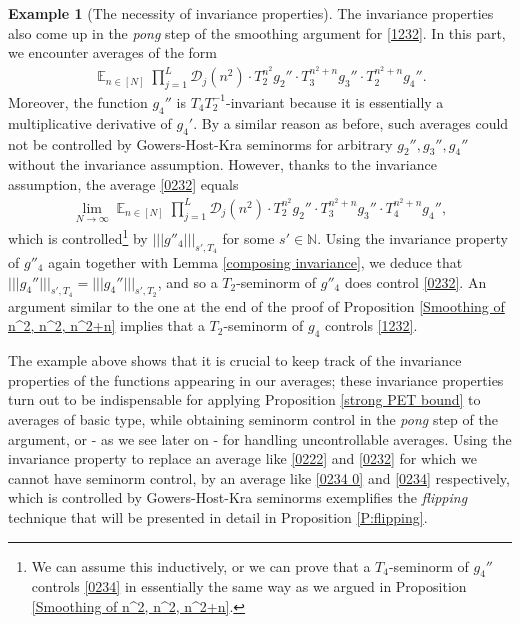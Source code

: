 \documentclass[11pt]{amsart}
\theoremstyle{definition}
\newtheorem{example}{Example}
\newcommand{\N}{{\mathbb N}}
\newcommand{\CD}{{\mathcal D}}
\newcommand{\nnorm}[1]{\lvert\!|\!| #1|\!|\!\rvert}
\newcommand{\inv}{^{-1}}
\DeclareMathOperator*{\E}{\mathbb{E}}
\begin{document}
\begin{example}[The necessity of invariance properties]
The invariance properties also come up in the \textit{pong} step of the smoothing argument for \eqref{1232}. In this part, we encounter averages of the form
\begin{align}\label{0232}
    \E_{n\in[N]}\prod_{j=1}^L \CD_{j}(n^2)\cdot T_2^{n^2} g_2''\cdot T_3^{n^2+n}g_3''\cdot T_2^{n^2+n}g_4''.
\end{align}
Moreover, the function $g_4''$ is $T_4 T_2\inv$-invariant because it is essentially a multiplicative derivative of $g_4'$. By a similar reason as before, such averages could not be controlled by Gowers-Host-Kra seminorms for arbitrary $g_2'', g_3'', g_4''$ without the invariance assumption. However, thanks to the invariance assumption, the average \eqref{0232} equals
\begin{align}\label{0234}
        \lim_{N\to\infty} \E_{n\in[N]}\prod_{j=1}^L \CD_{j}(n^2)\cdot T_2^{n^2} g_2''\cdot T_3^{n^2+n}g_3''\cdot T_4^{n^2+n}g_4'',
\end{align}
which is controlled\footnote{We can assume this inductively, or we can prove that a $T_4$-seminorm of $g_4''$ controls \eqref{0234} in essentially the same way as we argued in Proposition \ref{Smoothing of n^2, n^2, n^2+n}.} by $\nnorm{g''_4}_{s', T_4}$ for some $s'\in\N$. Using the invariance property of $g''_4$ again together with Lemma \ref{composing invariance}, we deduce that $\nnorm{g_4''}_{s', T_4} = \nnorm{g_4''}_{s', T_2}$,
and so a $T_2$-seminorm of $g''_4$ does control \eqref{0232}. An argument similar to the one at the end of the proof of Proposition \ref{Smoothing of n^2, n^2, n^2+n} implies that a $T_2$-seminorm of $g_4$ controls \eqref{1232}.
\end{example}
The example above shows that it is crucial to keep track of the invariance properties of the functions appearing in our averages; these invariance properties turn out to be indispensable for applying Proposition \ref{strong PET bound} to averages of basic type, while obtaining seminorm control in the \textit{pong} step of the argument, or - as we see later on - for handling uncontrollable averages. Using the invariance property to replace an average like \eqref{0222} and \eqref{0232} for which we cannot have seminorm control, by an average like \eqref{0234 0} and \eqref{0234} respectively,  which is controlled by Gowers-Host-Kra seminorms exemplifies the \textit{flipping} technique that will be presented in detail in Proposition \ref{P:flipping}.
\end{document}
